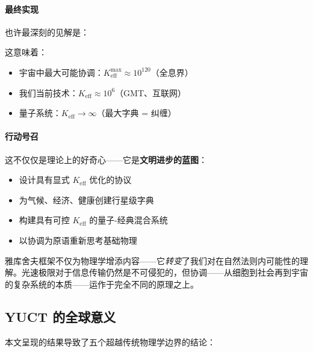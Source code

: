 \documentclass[11pt,a4paper]{article}
\begin{document}
	\paragraph{最终实现}
	也许最深刻的见解是：
	
	\begin{center}
	\end{center}
	
	这意味着：
	\begin{itemize}
		\item 宇宙中最大可能协调：$K_{\mathrm{eff}}^{\max} \approx 10^{120}$（全息界）
		\item 我们当前技术：$K_{\mathrm{eff}} \approx 10^6$（GMT、互联网）
		\item 量子系统：$K_{\mathrm{eff}} \to \infty$（最大字典 = 纠缠）
	\end{itemize}
	
	\paragraph{行动号召}
	这不仅仅是理论上的好奇心——它是\textbf{文明进步的蓝图}：
	
	\begin{itemize}
		\item 设计具有显式 $K_{\mathrm{eff}}$ 优化的协议
		\item 为气候、经济、健康创建行星级字典
		\item 构建具有可控 $K_{\mathrm{eff}}$ 的量子-经典混合系统
		\item 以协调为原语重新思考基础物理
	\end{itemize}
	
	雅库舍夫框架不仅为物理学增添内容——它\emph{转变}了我们对在自然法则内可能性的理解。光速极限对于信息传输仍然是不可侵犯的，但协调——从细胞到社会再到宇宙的复杂系统的本质——运作于完全不同的原理之上。
	
	\subsection{YUCT 的全球意义}
	
	本文呈现的结果导致了五个超越传统物理学边界的结论：
	
\end{document}
